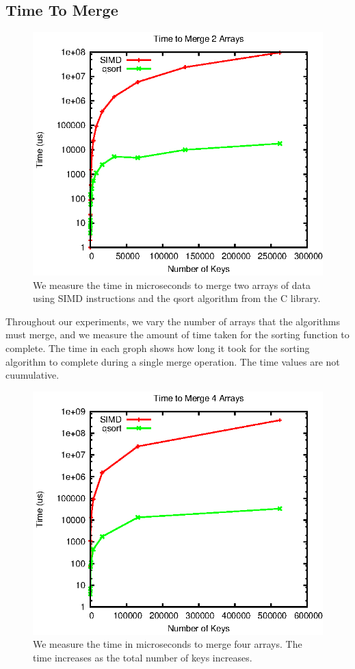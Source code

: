 \documentclass[10pt,twocolumn]{article}
\begin{document}
\subsection{Time To Merge}
\begin{figure}
\label{f2}
\includegraphics[width=\linewidth]{2.eps}
\caption{We measure the time in microseconds to merge two arrays of data using SIMD instructions and the qsort algorithm from the C library.}
\end{figure}

Throughout our experiments, we vary the number of arrays that the algorithms must merge, and we measure the amount of time taken for the sorting function to complete.  The time in each groph shows how long it took for the sorting algorithm to complete during a single merge operation.  The time values are not cuumulative.

\begin{figure}
\label{f4}
\includegraphics[width=\linewidth]{4.eps}
\caption{We measure the time in microseconds to merge four arrays.  The time increases as the total number of keys increases.}
\end{figure}
\end{document}
